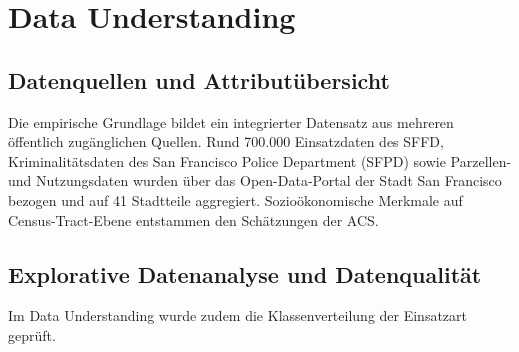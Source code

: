 \documentclass[12pt,a4paper]{article}
\begin{document}
\section{Data Understanding}
\subsection{Datenquellen und Attributübersicht}


Die empirische Grundlage bildet ein integrierter Datensatz aus mehreren öffentlich zugänglichen
Quellen. Rund 700.000 Einsatzdaten des SFFD, Kriminalitätsdaten des San Francisco Police Department
(SFPD) sowie Parzellen- und Nutzungsdaten wurden über das Open-Data-Portal der Stadt San Francisco
bezogen und auf 41 Stadtteile aggregiert. Sozioökonomische Merkmale auf Census-Tract-Ebene
entstammen den Schätzungen der ACS.


\subsection{Explorative Datenanalyse und Datenqualität}


Im Data Understanding wurde zudem die Klassenverteilung der Einsatzart geprüft.

\end{document}

